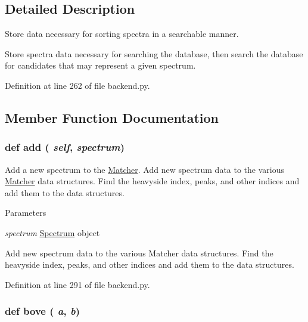 \subsection{Detailed Description}
Store data necessary for sorting spectra in a searchable manner. \begin{DoxyVerb}Store spectra data necessary for searching the database, then search the database
for candidates that may represent a given spectrum.\end{DoxyVerb}
 

Definition at line 262 of file backend.py.

\subsection{Member Function Documentation}
\hypertarget{classbackend_1_1_matcher_a66aa7c8063db6217a0a0061f8b7ba206}{
\subsubsection[{add}]{\setlength{\rightskip}{0pt plus 5cm}def add ( {\em self}, \/   {\em spectrum})}}
\label{classbackend_1_1_matcher_a66aa7c8063db6217a0a0061f8b7ba206}


Add a new spectrum to the \hyperlink{classbackend_1_1_matcher}{Matcher}. Add new spectrum data to the various \hyperlink{classbackend_1_1_matcher}{Matcher} data structures. Find the heavyside index, peaks, and other indices and add them to the data structures.


\begin{DoxyParams}{Parameters}
\item[{\em spectrum}]\hyperlink{classbackend_1_1_spectrum}{Spectrum} object\begin{DoxyVerb}Add new spectrum data to the various Matcher data structures. Find the heavyside
index, peaks, and other indices and add them to the data structures.\end{DoxyVerb}
 \end{DoxyParams}


Definition at line 291 of file backend.py.\hypertarget{classbackend_1_1_matcher_a989553190033eaa893e27d2907fce91e}{
\subsubsection[{bove}]{\setlength{\rightskip}{0pt plus 5cm}def bove ( {\em a}, \/   {\em b})}}
\label{classbackend_1_1_matcher_a989553190033eaa893e27d2907fce91e}


